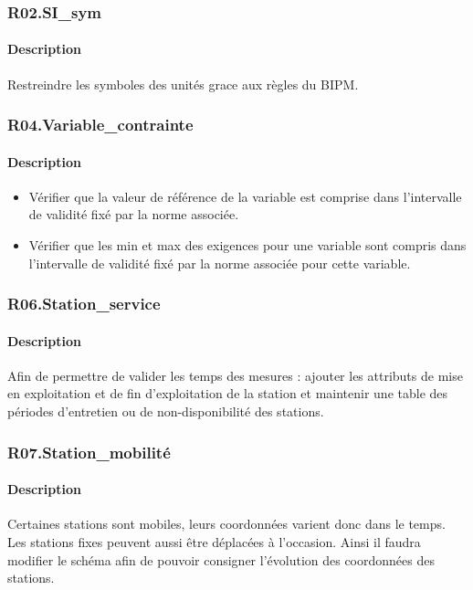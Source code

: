 \documentclass{article}
\begin{document}
\subsubsection{R02.SI\_sym}
\paragraph{Description} Restreindre les symboles des unités grace aux règles du BIPM.


\subsubsection{R04.Variable\_contrainte}
\paragraph{Description} 
\begin{itemize}
    \item Vérifier que la valeur de référence de la variable est comprise dans l'intervalle de
    validité fixé par la norme associée.
    \item Vérifier que les min et max des exigences pour une variable sont compris
    dans l'intervalle de validité fixé par la norme associée pour cette variable.
\end{itemize}


\subsubsection{R06.Station\_service}
\paragraph{Description} Afin de permettre de valider les temps des mesures :
ajouter les attributs de mise en exploitation et de fin d'exploitation de la station et 
maintenir une table des périodes d'entretien ou de non-disponibilité des stations.


\subsubsection{R07.Station\_mobilité}
\paragraph{Description} Certaines stations sont mobiles, leurs coordonnées varient donc dans le temps. Les stations fixes peuvent aussi
être déplacées à l'occasion. Ainsi il faudra modifier le schéma afin 
de pouvoir consigner l'évolution des coordonnées des stations.
\end{document}
